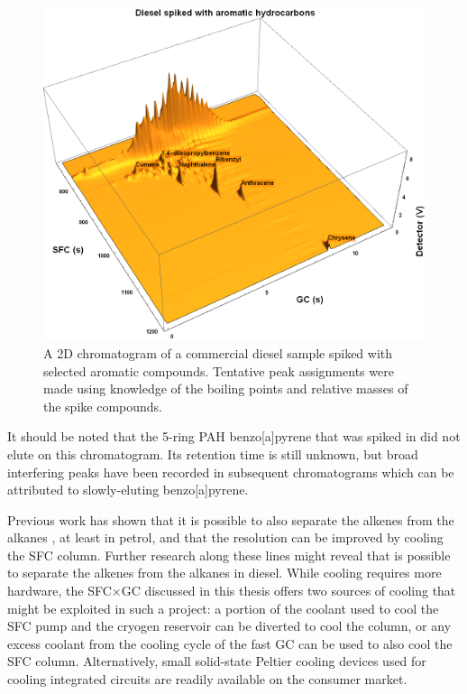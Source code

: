 \begin{figure}
	\centering
	\includegraphics[width=\textwidth]{Figures/Spiked_Diesel_Annotated.png}
	\decoRule	
	
\caption[Peak assignment in spiked diesel sample.]{A 2D chromatogram of a
commercial diesel sample spiked with selected aromatic compounds. Tentative peak
assignments were made using knowledge of the boiling points and relative masses
of the spike compounds.}

	\label{fig:Spiked_Diesel_Annotated} 
\end{figure}

It should be noted that the 5-ring PAH benzo[a]pyrene that was spiked in did not
elute on this chromatogram. Its retention time is still unknown, but broad
interfering peaks have been recorded in subsequent chromatograms which can be
attributed to slowly-eluting benzo[a]pyrene. 

Previous work has shown that it is possible to also separate the alkenes from
the alkanes \autocite{Venter1999}, at least in petrol, and that the resolution
can be improved by cooling the SFC column. Further research along these lines
might reveal that is possible to separate the alkenes from the alkanes in
diesel. While cooling requires more hardware, the SFC×GC discussed in this
thesis offers two sources of cooling that might be exploited in such a project:
a portion of the coolant used to cool the SFC pump and the cryogen reservoir can
be diverted to cool the column, or any excess coolant from the
cooling cycle of the fast GC can be used to also cool the SFC column.
Alternatively, small solid-state Peltier cooling devices used for cooling
integrated circuits are readily available on the consumer market.

